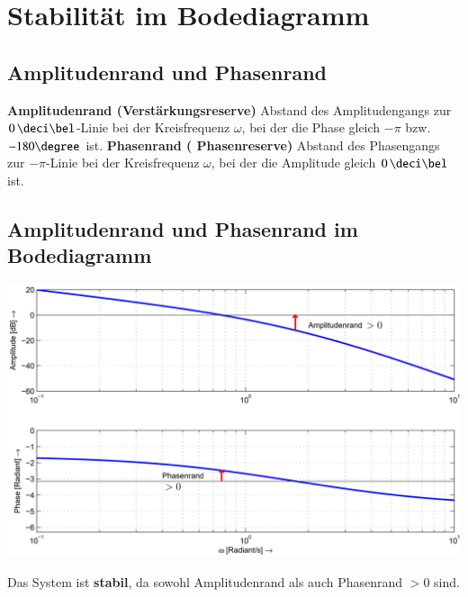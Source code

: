 \section{Stabilität im Bodediagramm}



\subsection{Amplitudenrand und Phasenrand }

\begin{outline}
    \1 \textbf{Amplitudenrand (Verstärkungsreserve)}
        \2 Abstand des Amplitudengangs zur $0 \, \deci \bel$-Linie bei der Kreisfrequenz $\omega$, bei der die Phase 
        gleich $- \pi$ bzw. $- 180 \degree$ ist.
    \1 \textbf{Phasenrand ( Phasenreserve)}
        \2 Abstand des Phasengangs zur $- \pi$-Linie bei der Kreisfrequenz $\omega$, bei der die Amplitude 
        gleich $0 \, \deci \bel$ ist.
\end{outline}


\subsection{Amplitudenrand und Phasenrand im Bodediagramm}

\begin{minipage}[c]{0.65\columnwidth}
    \includegraphics[width=\columnwidth]{images/bode_amplitudenrand_phasenrand.png}
\end{minipage}
\hfill
\begin{minipage}[c]{0.32\columnwidth}
    Das System ist \textbf{stabil}, da sowohl Amplitudenrand als auch Phasenrand $> 0$ sind.
\end{minipage}

